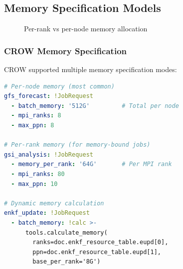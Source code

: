 \documentclass[11pt,twoside]{article}
\newcommand{\crow}{\textsc{CROW}}
\begin{document}
\subsection{Memory Specification Models}

\begin{figure}[H]
\centering
{}
\caption{Per-rank vs per-node memory allocation}
\label{fig:memory-model}
\end{figure}

\subsubsection{CROW Memory Specification}

\crow{} supported multiple memory specification modes:

\begin{lstlisting}[language=YAML, caption={\crow{} Memory Options}]
# Per-node memory (most common)
gfs_forecast: !JobRequest
  - batch_memory: '512G'         # Total per node
  - mpi_ranks: 8
  - max_ppn: 8

# Per-rank memory (for memory-bound jobs)  
gsi_analysis: !JobRequest
  - memory_per_rank: '64G'       # Per MPI rank
  - mpi_ranks: 80
  - max_ppn: 10

# Dynamic memory calculation
enkf_update: !JobRequest
  - batch_memory: !calc >-
      tools.calculate_memory(
        ranks=doc.enkf_resource_table.eupd[0],
        ppn=doc.enkf_resource_table.eupd[1],
        base_per_rank='8G')
\end{lstlisting}
\end{document}
